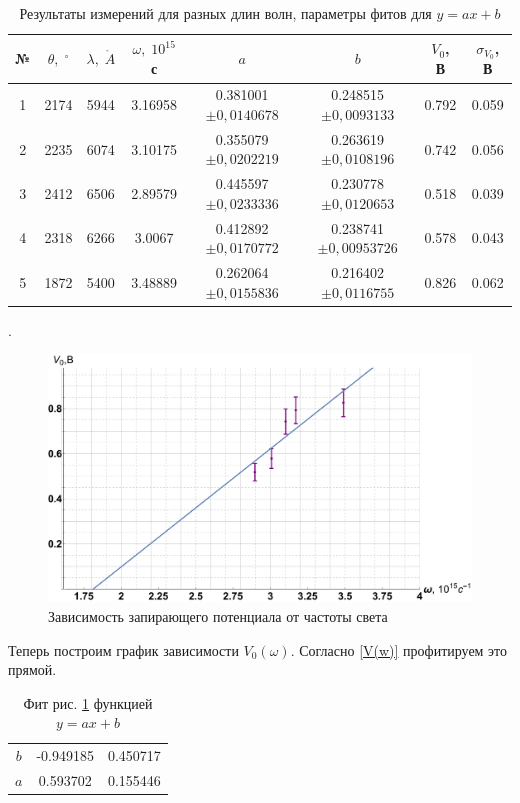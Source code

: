 \documentclass[12pt]{kiarticle}
\begin{document}
\begin{table}[h!]
	\caption{Результаты измерений для разных длин волн, параметры фитов для $ y = ax + b $}
	\begin{center}
		\begin{tabular}{|c|c|c|c|c|c|c|c|}
			\hline
			№ & $ \theta, \; ^\circ $& $ \lambda, \; \mathring{A} $ &  $ \omega, \; 10^{15} $ с & $ a $ & $ b $ & $ V_0 $, В & $ \sigma_{V_0} $, В \\
			\hline
		 1 & 2174 & 5944 & 3.16958 & 0.381001 $ \pm 0,0140678 $ & 0.248515 $ \pm 0,0093133 $& 0.792 & 0.059 \\
		2 & 2235 & 6074 & 3.10175 & 0.355079 $ \pm 0,0202219 $ & 0.263619 $ \pm 0,0108196 $& 0.742 & 0.056 \\
		3 & 2412 & 6506 & 2.89579 & 0.445597 $ \pm 0,0233336 $& 0.230778 $ \pm 0,0120653 $& 0.518 & 0.039 \\
		4 & 2318 & 6266 & 3.0067 & 0.412892 $ \pm 0,0170772 $ & 0.238741 $ \pm 0,00953726 $& 0.578 & 0.043 \\
		5 & 1872 & 5400 & 3.48889 & 0.262064 $ \pm0,0155836 $ & 0.216402 $ \pm 0,0116755 $& 0.826 & 0.062 \\
			\hline
		\end{tabular} 
	\end{center}
	\label{}
\end{table}
	\newpage
	.
	\begin{figure}[H]
		\includegraphics[scale=0.5]{V0.pdf}
		\caption{Зависимость запирающего потенциала
			от частоты света}
		\label{graf V0}
	\end{figure} 

Теперь построим график зависимости $ V_0(\omega) $. Согласно \eqref{V(w)} профитируем это прямой.

\begin{table}[H]
	\caption{Фит рис. \ref{graf V0} функцией $ y = ax + b $}
	\begin{center}
		\begin{tabular}{|c|c|c|}
			\hline
			& \text{Estimate} & \text{Standard Error} \\
			\hline
		 $ b $ & -0.949185 & 0.450717 \\
		$ a $ & 0.593702 & 0.155446 \\
			\hline 
		\end{tabular} 
	\end{center}
	\label{}
\end{table}
	
\end{document}
